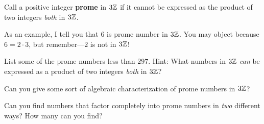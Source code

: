 \documentclass{ximera}
\begin{document}
\begin{definition}
Call a positive integer \textbf{prome} in $3\mathbb Z$ if it cannot be
expressed as the product of two integers \textit{both} in $3\mathbb Z$.
\end{definition}

As an example, I tell you that $6$ is prome number in $3\mathbb Z$. You may
object because $6 = 2\cdot 3$, but remember---$2$ is not in $3\mathbb Z$!


\begin{problem}
List some of the prome numbers less than $297$.  Hint:  What numbers in $3\mathbb Z$ \emph{can} be expressed as a product of two integers \emph{both} in $3\mathbb Z$?  
\end{problem}

\begin{problem}
Can you give some sort of algebraic characterization of prome numbers
in $3\mathbb Z$? 
\end{problem}

\begin{problem}
Can you find numbers that factor completely into prome numbers in
\textit{two} different ways? How many can you find?
\end{problem}
\end{document}
